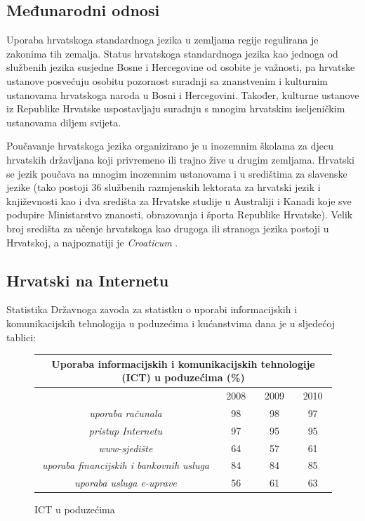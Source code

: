 \begin{multicols}{2}
\subsection{Međunarodni odnosi}

Uporaba hrvatskoga standardnoga jezika u zemljama regije regulirana je zakonima tih zemalja. Status hrvatskoga standardnoga jezika kao jednoga od službenih jezika susjedne Bosne i Hercegovine od osobite je važnosti, pa hrvatske ustanove posvećuju osobitu pozornost suradnji sa znanstvenim i kulturnim ustanovama hrvatskoga naroda u Bosni i Hercegovini. Također, kulturne ustanove iz Republike Hrvatske uspostavljaju suradnju s mnogim hrvatskim iseljeničkim ustanovama diljem svijeta.


Poučavanje hrvatskoga jezika organizirano je u inozemnim školama za djecu hrvatskih državljana koji privremeno ili trajno žive u drugim zemljama. Hrvatski se jezik poučava na mnogim inozemnim ustanovama i u središtima za slavenske jezike (tako postoji 36 službenih razmjenskih lektorata za hrvatski jezik i književnosti kao i dva središta za Hrvatske studije u Australiji i Kanadi koje sve podupire Ministarstvo znanosti, obrazovanja i športa Republike Hrvatske). Velik broj središta za učenje hrvatskoga kao drugoga ili stranoga jezika postoji u Hrvatskoj, a najpoznatiji je \emph{Croaticum} \cite{str10}.

\subsection{Hrvatski na Internetu}

Statistika Državnoga zavoda za statistku o uporabi informacijskih i komunikacijskih tehnologija u poduzećima i kućanstvima dana je u sljedećoj tablici:

\begin{figure}[htb]
\centering
    \begin{tabular}{|c|c|c|c|}
        \hline
      \multicolumn{4}{|c|}{\textbf{Uporaba informacijskih i komunikacijskih tehnologije (ICT) u poduzećima (\%)}} \\ \hline
        ~                                              & 2008 & 2009 & 2010 \\ \hline
        \emph{uporaba računala}                        & 98   & 98   & 97   \\ \hline
        \emph{pristup Internetu}                       & 97   & 95   & 95   \\ \hline
        \emph{www-sjedište}                            & 64   & 57   & 61   \\ \hline
        \emph{uporaba financijskih i bankovnih usluga} & 84   & 84   & 85   \\ \hline
        \emph{uporaba usluga e-uprave}                 & 56   & 61   & 63   \\
        \hline
   \end{tabular}
  \caption{ICT u poduzećima}
  \label{fig:IST_pod}
\end{figure}


\end{multicols}
